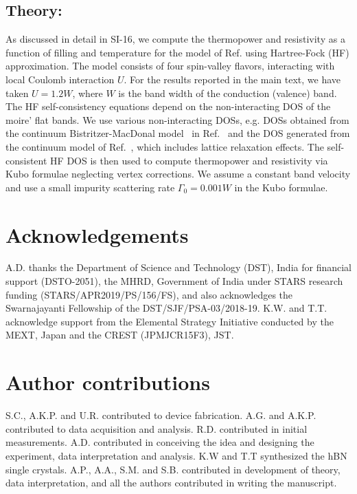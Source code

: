 \documentclass{nature}
\begin{document}
\subsection{Theory:} 
As discussed in detail in SI-16, we compute the thermopower and resistivity as a function of filling and temperature for the model of Ref.\cite{zondiner2020cascade} using Hartree-Fock (HF) approximation. The model consists of four spin-valley flavors, interacting with local Coulomb interaction $U$. For the results reported in the main text, we have taken $U=1.2 W$, where $W$ is the band width of the conduction (valence) band. The HF self-consistency equations depend on the non-interacting DOS of the moire' flat bands. We use various non-interacting DOSs, e.g. DOSs obtained from the continuum Bistritzer-MacDonal model~\cite{Bistritzer12233} in Ref.~\cite{zondiner2020cascade} and the DOS generated from the continuum model of Ref.~\cite{PhysRevX.8.031087}, which includes lattice relaxation effects. The self-consistent HF DOS is then used to compute thermopower and resistivity via Kubo formulae neglecting vertex corrections. We assume a constant band velocity and use a small impurity scattering rate $\Gamma_0=0.001W$ in the Kubo formulae.

\section{Acknowledgements}
A.D. thanks the Department of Science and Technology (DST), India for financial support (DSTO-2051), the MHRD, Government of India under STARS research funding (STARS/APR2019/PS/156/FS), and also acknowledges the Swarnajayanti Fellowship of the DST/SJF/PSA-03/2018-19. K.W. and T.T. acknowledge support from the Elemental Strategy Initiative conducted by the MEXT, Japan and the CREST (JPMJCR15F3), JST.


\section{Author contributions}
S.C., A.K.P. and U.R. contributed to device fabrication. A.G. and A.K.P. contributed to data acquisition and analysis. R.D. contributed in initial measurements. A.D. contributed in conceiving the idea and designing the experiment, data interpretation and analysis. K.W and T.T synthesized the hBN single crystals. A.P., A.A., S.M. and S.B. contributed in development of theory, data interpretation, and all the authors contributed in writing the manuscript.


\thispagestyle{empty}
\mbox{}







\end{document}
